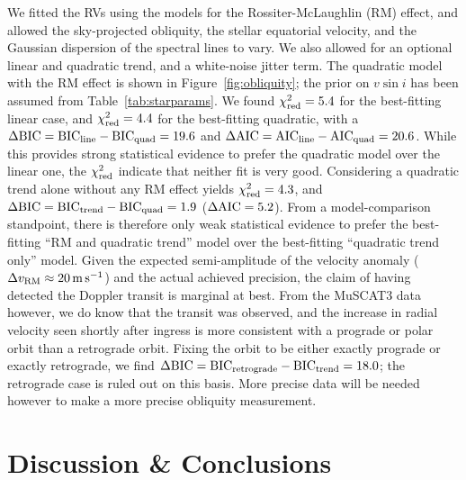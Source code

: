 \documentclass[12pt,modern,twocolumn,tighten]{aastex63}
\begin{document}
%
%
%
% 

We fitted the RVs using the \citet{hirano_analytic_2010,hirano_2011}
models for the Rossiter-McLaughlin (RM) effect, and allowed the
sky-projected obliquity, the stellar equatorial velocity, and the
Gaussian dispersion of the spectral lines to vary.  We also allowed
for an optional linear and quadratic trend, and a white-noise jitter
term.  The quadratic model with the RM effect is shown in
Figure~\ref{fig:obliquity}; the prior on $v\sin i$ has been
assumed from Table~\ref{tab:starparams}.  We found $\chi^2_{\rm red} =
5.4$ for the best-fitting linear case, and $\chi^2_{\rm red} = 4.4$
for the best-fitting quadratic, with a $\Delta {\rm BIC} = {\rm
BIC}_{\rm line} - {\rm BIC}_{\rm quad} = 19.6$ and $\Delta {\rm AIC} =
{\rm AIC}_{\rm line} - {\rm AIC}_{\rm quad} = 20.6$.  While this
provides strong statistical evidence to prefer the quadratic model
over the linear one, the $\chi^2_{\rm red}$ indicate that neither fit
is very good.  Considering a quadratic trend alone without any RM
effect yields $\chi^2_{\rm red} = 4.3$, and $\Delta {\rm BIC} = {\rm
BIC}_{\rm trend} - {\rm BIC}_{\rm quad} = 1.9$ ($\Delta {\rm
AIC}=5.2$).  From a model-comparison standpoint, there is therefore
only weak statistical evidence to prefer the best-fitting ``RM and
quadratic trend'' model over the best-fitting ``quadratic trend only''
model.  Given the expected semi-amplitude of the velocity anomaly
($\Delta v_{\rm RM}\approx 20\,{\rm m\,s}^{-1}$) and the actual
achieved precision, the claim of having detected the Doppler transit
is marginal at best.  From the MuSCAT3 data however, we do know that
the transit was observed, and the increase in radial velocity seen
shortly after ingress is more consistent with a prograde or polar
orbit than a retrograde orbit.  Fixing the orbit to be either exactly
prograde or exactly retrograde, we find $\Delta {\rm BIC} = {\rm
BIC}_{\rm retrograde} - {\rm BIC}_{\rm trend} = 18.0$; the retrograde
case is ruled out on this basis.  More precise data will be needed
however to make a more precise obliquity measurement.


\section{Discussion \& Conclusions}
\label{sec:conc}
\end{document}
